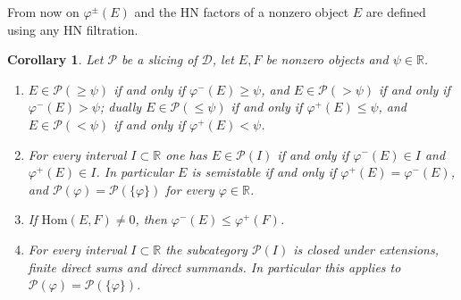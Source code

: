 \documentclass[12pt]{amsart}
\newtheorem{corollary}[theorem]{Corollary}
\numberwithin{theorem}{section}
\theoremstyle{definition}
\newcommand{\RR}{\mathbb{R}}
\newcommand{\calP}{\mathcal{P}}
\newcommand{\Hom}{\mathrm{Hom}}
\newcommand{\calD}{\mathcal{D}}
\begin{document}
	From now on $\varphi^{\pm}(E)$ and the HN factors of a nonzero object $E$ are defined using any HN filtration.

	\begin{corollary}
		\label{cor:slicing_phases}
		Let $\calP$ be a slicing of $\calD$, let $E, F$ be nonzero objects and $\psi \in \RR$.
		\begin{enumerate}
			\item $E \in \calP(\geqslant \psi)$ if and only if $\varphi^-(E) \geqslant \psi$, and $E \in \calP(> \psi)$ if and only if $\varphi^-(E) > \psi$;
			dually $E \in \calP(\leqslant \psi)$ if and only if $\varphi^+(E) \leqslant \psi$, and $E \in \calP(< \psi)$ if and only if $\varphi^+(E) < \psi$.
			\item For every interval $I \subset \RR$ one has $E \in \calP(I)$ if and only if $\varphi^-(E) \in I$ and $\varphi^+(E) \in I$.
			In particular $E$ is semistable if and only if $\varphi^+(E) = \varphi^-(E)$, and $\calP(\varphi) = \calP(\{ \varphi \})$ for every $\varphi \in \RR$.
			\item If $\Hom(E, F) \neq 0$, then $\varphi^-(E) \leqslant \varphi^+(F)$.
			\item For every interval $I \subset \RR$ the subcategory $\calP(I)$ is closed under extensions, finite direct sums and direct summands.
			In particular this applies to $\calP(\varphi) = \calP(\{ \varphi \})$.
		\end{enumerate}
	\end{corollary}
\end{document}
